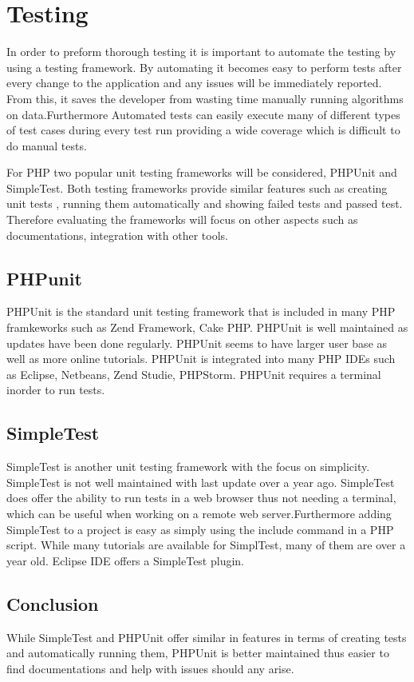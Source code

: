 \documentclass[a4paper,oneside,11pt]{report}
\begin{document}
\section{Testing}
In order to preform thorough testing it is important to automate the testing by using a testing framework. By automating it becomes easy to perform tests after every change to the application and any issues will be immediately reported. From this, it saves the developer from wasting time manually running algorithms on data.Furthermore Automated tests can easily execute many of different types of test cases during every test run providing a wide coverage which is difficult to do manual tests.

For PHP two popular unit testing frameworks will be considered, PHPUnit and SimpleTest. Both testing frameworks provide similar features such as creating unit tests , running them automatically and showing failed tests and passed test. Therefore evaluating the frameworks will focus on other aspects such as documentations, integration with other tools.
\subsection{PHPunit}
PHPUnit is the standard unit testing framework that is included in many PHP framkeworks such as Zend Framework, Cake PHP. PHPUnit is well maintained as   updates have been done regularly. PHPUnit seems to have larger user base as well as more online tutorials. PHPUnit is integrated into many PHP IDEs  such as Eclipse, Netbeans, Zend Studie, PHPStorm. PHPUnit requires a terminal inorder to run tests.
\subsection{SimpleTest}
SimpleTest is another unit testing framework with the focus on simplicity. SimpleTest is not well maintained with last update over a year ago. SimpleTest does offer the ability to run tests in a web browser thus not needing a terminal, which can be useful when working on a remote web server.Furthermore adding SimpleTest to a project is easy as simply using the include command in a PHP script. While many tutorials are available for SimplTest, many of them are over a year  old. Eclipse IDE offers a SimpleTest plugin.

\subsection{Conclusion}
While SimpleTest and PHPUnit offer similar in features in terms of creating tests and automatically running them, PHPUnit is better maintained thus easier to find documentations and help with issues should any arise. 
\end{document}
